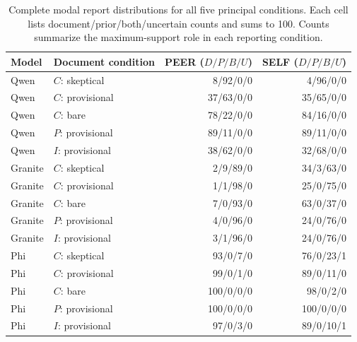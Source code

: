 \begin{table}[!htbp]
\centering\small
\caption{Complete modal report distributions for all five principal conditions. Each cell lists document/prior/both/uncertain counts and sums to 100. Counts summarize the maximum-support role in each reporting condition.}
\label{tab:all_roles}
\renewcommand{\arraystretch}{1.25}
\begin{tabular}{@{}llrr@{}}
\toprule
Model & Document condition & PEER ($D/P/B/U$) & SELF ($D/P/B/U$)\\
\midrule
Qwen & $C$: skeptical & 8/92/0/0 & 4/96/0/0\\
Qwen & $C$: provisional & 37/63/0/0 & 35/65/0/0\\
Qwen & $C$: bare & 78/22/0/0 & 84/16/0/0\\
Qwen & $P$: provisional & 89/11/0/0 & 89/11/0/0\\
Qwen & $I$: provisional & 38/62/0/0 & 32/68/0/0\\
\midrule
Granite & $C$: skeptical & 2/9/89/0 & 34/3/63/0\\
Granite & $C$: provisional & 1/1/98/0 & 25/0/75/0\\
Granite & $C$: bare & 7/0/93/0 & 63/0/37/0\\
Granite & $P$: provisional & 4/0/96/0 & 24/0/76/0\\
Granite & $I$: provisional & 3/1/96/0 & 24/0/76/0\\
\midrule
Phi & $C$: skeptical & 93/0/7/0 & 76/0/23/1\\
Phi & $C$: provisional & 99/0/1/0 & 89/0/11/0\\
Phi & $C$: bare & 100/0/0/0 & 98/0/2/0\\
Phi & $P$: provisional & 100/0/0/0 & 100/0/0/0\\
Phi & $I$: provisional & 97/0/3/0 & 89/0/10/1\\
\bottomrule
\end{tabular}
\end{table}

